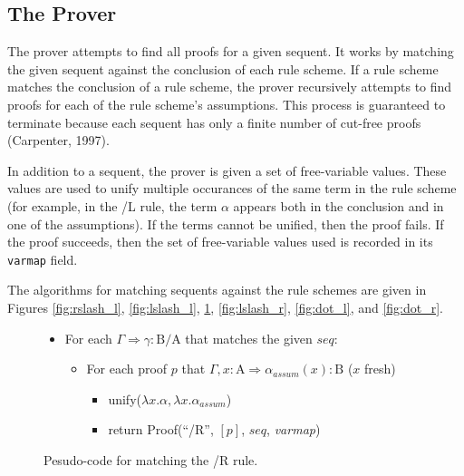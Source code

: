 \documentclass[11pt]{article}
\begin{document}
\subsection{The Prover}

The prover attempts to find all proofs for a given sequent.  It works
by matching the given sequent against the conclusion of each rule
scheme.  If a rule scheme matches the conclusion of a rule scheme, the
prover recursively attempts to find proofs for each of the rule
scheme's assumptions.  This process is guaranteed to terminate because 
each sequent has only a finite number of cut-free proofs (Carpenter,
1997).  

In addition to a sequent, the prover is given a set of free-variable
values.  These values are used to unify multiple occurances of the
same term in the rule scheme (for example, in the /L rule, the term
$\alpha$ appears both in the conclusion and in one of the assumptions).
If the terms cannot be unified, then the proof fails.  If the proof
succeeds, then the set of free-variable values used is recorded in its 
\texttt{varmap} field.

The algorithms for matching sequents against the rule schemes are
given in Figures \ref{fig:rslash_l}, \ref{fig:lslash_l},
\ref{fig:rslash_r}, \ref{fig:lslash_r}, \ref{fig:dot_l}, and
\ref{fig:dot_r}.  

\begin{figure}
\noindent
\begin{boxedminipage}{\textwidth}
\begin{itemize}
  \item For each $\Gamma \Rightarrow \gamma:\textrm{B/A}$ that matches the given $seq$:
  \begin{itemize}
    \item For each proof $p$ that 
          $\Gamma, x:\textrm{A} \Rightarrow \alpha_{assum}(x):\textrm{B}$ ($x$ fresh)
    \begin{itemize}
      \item unify($\lambda x.\alpha, \lambda x.\alpha_{assum}$)
      \item return Proof(``/R'', $[p]$, $seq$, \textit{varmap})
    \end{itemize}
  \end{itemize}
\end{itemize}
\vspace{2mm}
\end{boxedminipage}
\caption{Pesudo-code for matching the /R rule.}
\label{fig:rslash_r}
\end{figure}
\end{document}
